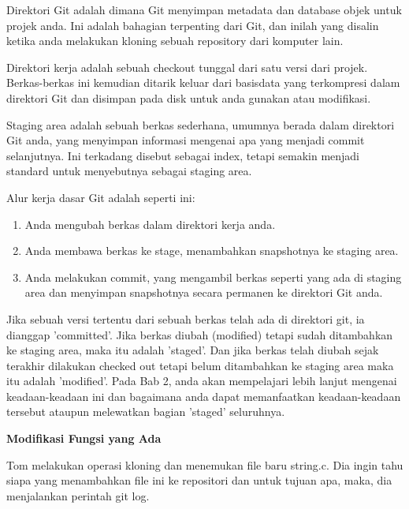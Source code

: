 \documentclass[12pt,a4paper]{article}
\begin{document}
Direktori Git adalah dimana Git menyimpan metadata dan database objek 
untuk projek anda. Ini adalah bahagian terpenting dari Git, dan inilah 
yang disalin ketika anda melakukan kloning sebuah repository dari 
komputer lain.\vspace{12pt}

Direktori kerja adalah sebuah checkout tunggal dari satu versi dari 
projek. Berkas-berkas ini kemudian ditarik keluar dari basisdata yang 
terkompresi dalam direktori Git dan disimpan pada disk untuk anda 
gunakan atau modifikasi.\vspace{12pt}

Staging area adalah sebuah berkas sederhana, umumnya berada dalam 
direktori Git anda, yang menyimpan informasi mengenai apa yang menjadi 
commit selanjutnya. Ini terkadang disebut sebagai index, tetapi semakin 
menjadi standard untuk menyebutnya sebagai staging area.\vspace{12pt}

Alur kerja dasar Git adalah seperti ini:

\begin{enumerate}
\item Anda mengubah berkas dalam direktori kerja anda.
\item Anda membawa berkas ke stage, menambahkan snapshotnya ke staging 
area.
\item Anda melakukan commit, yang mengambil berkas seperti yang ada di 
staging area dan menyimpan snapshotnya secara permanen ke direktori Git 
anda.
\setcounter{numberedCntF}{\theenumi}
\end{enumerate}
Jika sebuah versi tertentu dari sebuah berkas telah ada di direktori 
git, ia dianggap 'committed'. Jika berkas diubah (modified) tetapi sudah 
ditambahkan ke staging area, maka itu adalah 'staged'. Dan jika berkas 
telah diubah sejak terakhir dilakukan checked out tetapi belum 
ditambahkan ke staging area maka itu adalah 'modified'. Pada Bab 2, anda 
akan mempelajari lebih lanjut mengenai keadaan-keadaan ini dan bagaimana 
anda dapat memanfaatkan keadaan-keadaan tersebut ataupun melewatkan 
bagian 'staged' seluruhnya.\vspace{12pt}

\textbf{Modifikasi Fungsi yang Ada}\vspace{12pt}

Tom melakukan operasi kloning dan menemukan file baru string.c. Dia 
ingin tahu siapa yang menambahkan file ini ke repositori dan untuk 
tujuan apa, maka, dia menjalankan perintah git log.\vspace{12pt}
\end{document}
